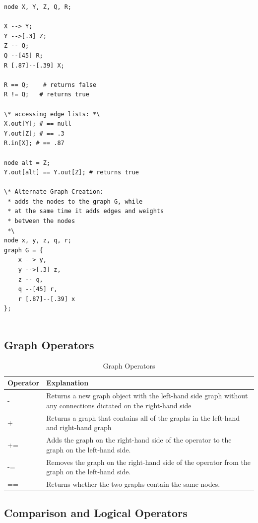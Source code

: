 \documentclass{article}
\begin{document}
\begin{lstlisting}[language=pltLang, caption=Shows the use of node operators that creates the graph in Figure \ref{fig:node_ops}., label=lst:node-ops]
node X, Y, Z, Q, R;

X --> Y;
Y -->[.3] Z;
Z -- Q;
Q --[45] R;
R [.87]--[.39] X;

R == Q;    # returns false
R != Q;   # returns true

\* accessing edge lists: *\
X.out[Y]; # == null
Y.out[Z]; # == .3
R.in[X]; # == .87

node alt = Z;
Y.out[alt] == Y.out[Z]; # returns true

\* Alternate Graph Creation:
 * adds the nodes to the graph G, while
 * at the same time it adds edges and weights
 * between the nodes
 *\
node x, y, z, q, r;
graph G = {
    x --> y,
    y -->[.3] z,
    z -- q,
    q --[45] r,
    r [.87]--[.39] x
};
    

\end{lstlisting}

\subsection{Graph Operators}

\begin{table}[H]
\centering
\begin{tabular}{| p{1.5in} | p{2.75in} |}
\hline
Operator & Explanation \\
\hline
- & Returns a new graph object with the left-hand side graph without any connections dictated on the right-hand side \\
\hline
+ & Returns a graph that contains all of the graphs in the left-hand and right-hand graph \\
\hline
+= & Adds the graph on the right-hand side of the operator to the graph on the left-hand side. \\
\hline
-= & Removes the graph on the right-hand side of the operator from the graph on the left-hand side. \\
\hline
== & Returns whether the two graphs contain the same nodes. \\
\hline
\end{tabular}
\caption{Graph Operators}
\label{tbl:graph-ops}
\end{table}

\subsection{Comparison and Logical Operators}
\end{document}
